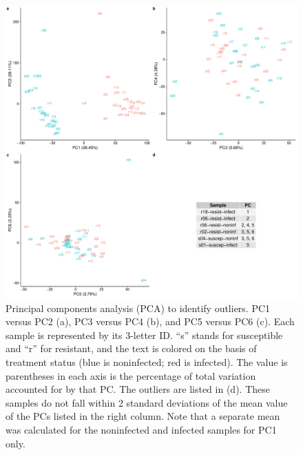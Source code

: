 \documentclass[fleqn,10pt]{wlscirep}
\begin{document}
\begin{figure}[ht]
\centering
\includegraphics[width=\linewidth]{../figure/outliers.pdf}
\caption{
Principal components analysis (PCA) to identify outliers. PC1 versus
PC2 (a), PC3 versus PC4 (b), and PC5 versus PC6 (c). Each sample is
represented by its 3-letter ID. “s” stands for susceptible and “r” for
resistant, and the text is colored on the basis of treatment status
(blue is noninfected; red is infected). The value is parentheses in
each axis is the percentage of total variation accounted for by that
PC. The outliers are listed in (d). These samples do not fall within 2
standard deviations of the mean value of the PCs listed in the right
column. Note that a separate mean was calculated for the noninfected
and infected samples for PC1 only.
}
\label{fig:outliers}
\end{figure}
\end{document}
